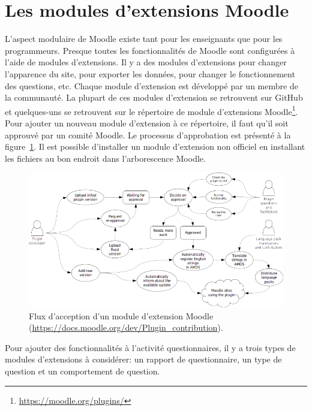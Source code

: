 \section{Les modules d'extensions Moodle}
L'aspect modulaire de Moodle existe tant pour les enseignants que pour les programmeurs.
Presque toutes les fonctionnalit\'es de Moodle sont configur\'ees \`a l'aide de modules d'extensions.
Il y a des modules d'extensions pour changer l'apparence du site, pour exporter les donn\'ees, pour changer le fonctionnement des questions, etc.
Chaque module d'extension est d\'evelopp\'e par un membre de la communaut\'e.
La plupart de ces modules d'extension se retrouvent sur GitHub et quelques-uns se retrouvent sur le r\'epertoire de module d'extensions Moodle\footnote{\url{https://moodle.org/plugins/}}.
Pour ajouter un nouveau module d'extension \`a ce r\'epertoire, il faut qu'il soit approuv\'e par un comit\'e Moodle.
Le processus d'approbation est pr\'esent\'e \`a la figure~\ref{plugin-workflow}.
Il est possible d'installer un module d'extension non officiel en installant les fichiers au bon endroit dans l'arborescence Moodle.
\begin{figure}[h!]
  \includegraphics[scale=0.7]{images/plugin-contribution-workflow.png}
  \caption[Flux d'acception d'un module d'extension Moodle]{Flux d'acception d'un module d'extension Moodle (\href{https://docs.moodle.org/dev/Plugin_contribution}{\url{https://docs.moodle.org/dev/Plugin\_contribution}}).}
  \label{plugin-workflow}
\end{figure}
Pour ajouter des fonctionnalit\'es \`a l'activit\'e questionnaires, il y a trois types de modules d'extensions \`a consid\'erer: un rapport de questionnaire, un type de question et un comportement de question.
